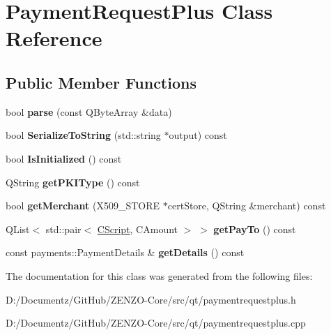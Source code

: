 \hypertarget{class_payment_request_plus}{}\section{Payment\+Request\+Plus Class Reference}
\label{class_payment_request_plus}
\subsection*{Public Member Functions}
\begin{DoxyCompactItemize}
\item 
\mbox{\label{class_payment_request_plus_aaa495c136209bac976cc195705a6c509}} 
bool {\bfseries parse} (const Q\+Byte\+Array \&data)
\item 
\mbox{\label{class_payment_request_plus_afa9333f9f50c9ce8e137aef31cfd01b4}} 
bool {\bfseries Serialize\+To\+String} (std\+::string $\ast$output) const
\item 
\mbox{\label{class_payment_request_plus_aa3d8c57af7c7bc4ffbc31da32e5a40a6}} 
bool {\bfseries Is\+Initialized} () const
\item 
\mbox{\label{class_payment_request_plus_a1281cfdfc0ba75e930dc644bf28f0649}} 
Q\+String {\bfseries get\+P\+K\+I\+Type} () const
\item 
\mbox{\label{class_payment_request_plus_a3d13d13cf6a552695971cc257a33ca81}} 
bool {\bfseries get\+Merchant} (X509\+\_\+\+S\+T\+O\+RE $\ast$cert\+Store, Q\+String \&merchant) const
\item 
\mbox{\label{class_payment_request_plus_a4fb6e542f80d3b0af860f2c436b6bbe1}} 
Q\+List$<$ std\+::pair$<$ \mbox{\hyperlink{class_c_script}{C\+Script}}, C\+Amount $>$ $>$ {\bfseries get\+Pay\+To} () const
\item 
\mbox{\label{class_payment_request_plus_ab0ebee8009c066b45811fe59a07da230}} 
const payments\+::\+Payment\+Details \& {\bfseries get\+Details} () const
\end{DoxyCompactItemize}


The documentation for this class was generated from the following files\+:\begin{DoxyCompactItemize}
\item 
D\+:/\+Documentz/\+Git\+Hub/\+Z\+E\+N\+Z\+O-\/\+Core/src/qt/paymentrequestplus.\+h\item 
D\+:/\+Documentz/\+Git\+Hub/\+Z\+E\+N\+Z\+O-\/\+Core/src/qt/paymentrequestplus.\+cpp\end{DoxyCompactItemize}

